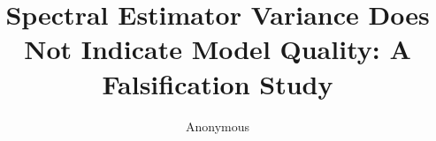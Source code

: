 \documentclass[letterpaper]{article}
\title{Spectral Estimator Variance Does Not Indicate Model Quality: A Falsification Study}
\author{Anonymous}
\date{}
\begin{document}
\maketitle

\begin{abstract}

\end{abstract}











\end{document}

